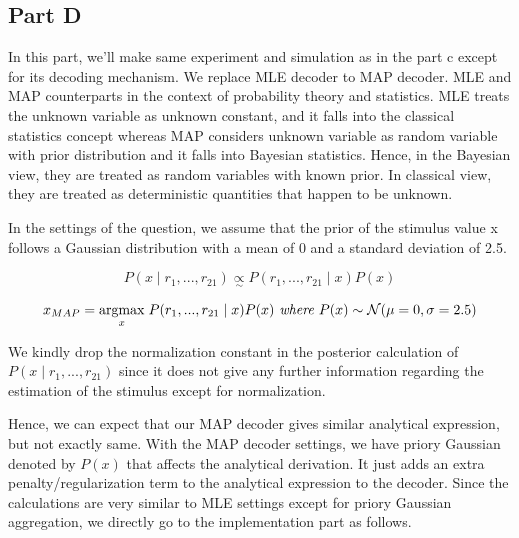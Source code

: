 \documentclass[12pt]{amsart}
\begin{document}
\subsection{Part D}
In this part, we'll make same experiment and simulation as in the part c except for its decoding mechanism. We replace MLE decoder to MAP decoder. MLE and MAP counterparts in the context of probability theory and statistics. MLE treats the unknown variable as unknown constant, and it falls into the classical statistics concept whereas MAP considers unknown variable as random variable with prior distribution and it falls into Bayesian statistics. Hence, in the Bayesian view, they are treated as random variables with known prior. In classical view, they are treated as deterministic quantities that happen to be unknown.

\bigskip
In the settings of the question, we assume that the prior of the stimulus value x follows a Gaussian distribution with a mean of 0 and a standard deviation of 2.5.

\begin{equation*}
   P( x \mid  r_1,...,r_{21}) \underset{\sim}{\propto} P(r_1,...,r_{21}  \mid  x) P(x)
\end{equation*}


\begin{equation*}
   x_{MAP} =  \underset{x}{\mathrm{argmax}} \hspace{1mm} P(r_1,...,r_{21}  \mid  x) P(x) \textit{ where $P(x)$}  \sim \mathcal{N}( \mu = 0, \sigma = 2.5)  
\end{equation*}

We kindly drop the normalization constant in the posterior calculation of $P(x\mid  r_1,...,r_{21})$ since it does not give any further information regarding the estimation of the stimulus except for normalization.

\bigskip
Hence, we can expect that our MAP decoder gives similar analytical expression, but not exactly same. With the MAP decoder settings, we have priory Gaussian denoted by $P(x)$ that affects the analytical derivation. It just adds an extra penalty/regularization term to the analytical expression to the decoder. Since the calculations are very similar to MLE settings except for priory Gaussian aggregation, we directly go to the implementation part as follows.
\end{document}
